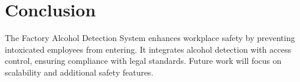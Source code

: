 \documentclass[12pt]{article}
\begin{document}
    \section{Conclusion}
    \label{sec:conclusion}
    The Factory Alcohol Detection System enhances workplace safety by preventing intoxicated employees from entering. It integrates alcohol detection with access control, ensuring compliance with legal standards. Future work will focus on scalability and additional safety features.

    \appendix
    

    
    

\end{document}
